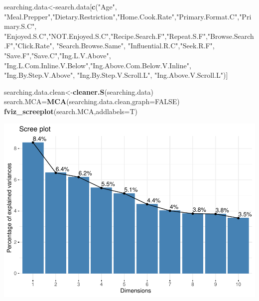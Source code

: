 \documentclass[
]{article}
\newenvironment{Shaded}{\begin{snugshade}}{\end{snugshade}}
\newcommand{\DataTypeTok}[1]{\textcolor[rgb]{0.13,0.29,0.53}{#1}}
\newcommand{\KeywordTok}[1]{\textcolor[rgb]{0.13,0.29,0.53}{\textbf{#1}}}
\newcommand{\NormalTok}[1]{#1}
\newcommand{\OtherTok}[1]{\textcolor[rgb]{0.56,0.35,0.01}{#1}}
\newcommand{\StringTok}[1]{\textcolor[rgb]{0.31,0.60,0.02}{#1}}
\begin{document}
\begin{Shaded}
\begin{Highlighting}[]
\NormalTok{searching.data<-search.data[}\KeywordTok{c}\NormalTok{(}\StringTok{"Age"}\NormalTok{, }\StringTok{"Meal.Prepper"}\NormalTok{,}\StringTok{"Dietary.Restriction"}\NormalTok{,}\StringTok{"Home.Cook.Rate"}\NormalTok{,}\StringTok{"Primary.Format.C"}\NormalTok{,}\StringTok{"Primary.S.C"}\NormalTok{,}
            \StringTok{"Enjoyed.S.C"}\NormalTok{,}\StringTok{"NOT.Enjoyed.S.C"}\NormalTok{,}\StringTok{"Recipe.Search.F"}\NormalTok{,}\StringTok{"Repeat.S.F"}\NormalTok{,}\StringTok{"Browse.Search.F"}\NormalTok{,}\StringTok{"Click.Rate"}\NormalTok{,}
            \StringTok{"Search.Browse.Same"}\NormalTok{, }\StringTok{"Influential.R.C"}\NormalTok{,}\StringTok{"Seek.R.F"}\NormalTok{, }\StringTok{"Save.F"}\NormalTok{,}\StringTok{"Save.C"}\NormalTok{,}\StringTok{"Ing.L.V.Above"}\NormalTok{,}
            \StringTok{"Ing.L.Com.Inline.V.Below"}\NormalTok{,}\StringTok{"Ing.Above.Com.Below.V.Inline"}\NormalTok{,  }\StringTok{"Ing.By.Step.V.Above"}\NormalTok{,  }\StringTok{"Ing.By.Step.V.Scroll.L"}\NormalTok{,}
            \StringTok{"Ing.Above.V.Scroll.L"}\NormalTok{)]}

\NormalTok{searching.data.clean<-}\KeywordTok{cleaner.S}\NormalTok{(searching.data)}
\NormalTok{search.MCA=}\KeywordTok{MCA}\NormalTok{(searching.data.clean,}\DataTypeTok{graph=}\OtherTok{FALSE}\NormalTok{)}
\KeywordTok{fviz_screeplot}\NormalTok{(search.MCA,}\DataTypeTok{addlabels=}\NormalTok{T)}
\end{Highlighting}
\end{Shaded}

\includegraphics{Average-User-MCA_files/figure-latex/mca searching all-1.pdf}
\end{document}
